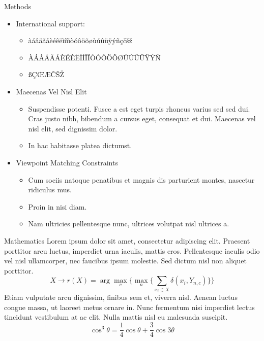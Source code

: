 \documentclass{beamer} %
\begin{document}
\begin{frame}[t]
\begin{columns}[t]
\begin{column}{0.465\textwidth}
\begin{block}{Methods}	
	\begin{itemize}
		\item International support:
		\begin{itemize}
			\item àáâäãåèéêëìíîïòóôöõøùúûüÿýñçčšž
			\item ÀÁÂÄÃÅÈÉÊËÌÍÎÏÒÓÔÖÕØÙÚÛÜŸÝÑ
			\item ßÇŒÆČŠŽ
		\end{itemize}
		\item Maecenas Vel Nisl Elit
		\begin{itemize}
			\item Suspendisse potenti. Fusce a est eget turpis rhoncus varius sed sed dui. Cras justo nibh, bibendum a cursus eget, consequat et dui. Maecenas vel nisl elit, sed dignissim dolor. 
			\item In hac habitasse platea dictumst.
		\end{itemize}
		
		\item Viewpoint Matching Constraints
		\begin{itemize}
			\item Cum sociis natoque penatibus et magnis dis parturient montes, nascetur ridiculus mus. 
			\item Proin in nisi diam.
			\item Nam ultricies pellentesque nunc, ultrices volutpat nisl ultrices a.
		\end{itemize}
	\end{itemize}
\end{block}


\begin{block}{Mathematics}
	Lorem ipsum dolor sit amet, consectetur adipiscing elit. Praesent porttitor arcu luctus, imperdiet urna iaculis, mattis eros. Pellentesque iaculis odio vel nisl ullamcorper, nec faucibus ipsum molestie. Sed dictum nisl non aliquet porttitor.
	\begin{equation}
		X \rightarrow r(X) = \arg \max_{c} \Big\{ \max_n \big\{ \sum_{x_i \in X} \delta(x_i,Y_{n,c})\big\} \Big\} 
	\end{equation}
	Etiam vulputate arcu dignissim, finibus sem et, viverra nisl. Aenean luctus congue massa, ut laoreet metus ornare in. Nunc fermentum nisi imperdiet lectus tincidunt vestibulum at ac elit. Nulla mattis nisl eu malesuada suscipit.
	\begin{equation}
		\cos^3 \theta =\frac{1}{4}\cos\theta+\frac{3}{4}\cos 3\theta
	\end{equation}
\end{block}


\end{column}
\end{columns}
\end{frame}
\end{document}

